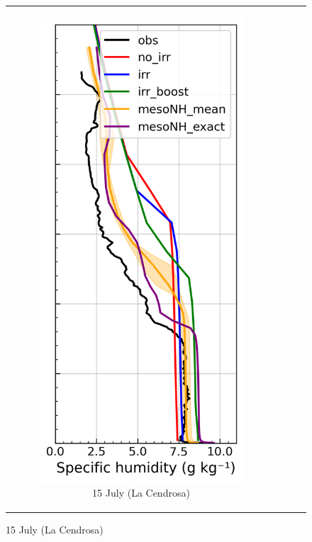 \begin{figure}[hbtp]
{\begin{tabular}{@{}cccc@{}}
        \begin{subfigure}[t]{0.289\textwidth}
            \caption{15 July (La Cendrosa)}
            \includegraphics[width=\textwidth]{images/chap5/profiles/profile_cendrosa_ovap_1507_.png}

\end{subfigure}
\end{tabular}}
\end{figure}
